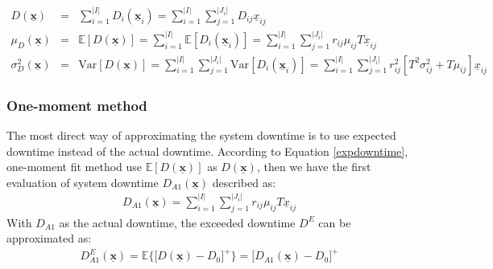 \documentclass[preprint,12pt]{elsarticle}
\begin{document}
\begin{eqnarray}
D(\boldsymbol{\underline{x}}) &=& \sum_{i=1}^{\lvert I \rvert}D_{i}(\boldsymbol{\underline{x}}_{i})
=\sum_{i=1}^{\lvert I \rvert}\sum_{j=1}^{\lvert J_{i}\rvert}{D_{ij}\underline{x}_{ij}}  \\
\mu_{D}(\boldsymbol{\underline{x}})&=&\mathbb{E}[D(\boldsymbol{\underline{x}})] = \sum^{\lvert I \rvert}_{i=1}\mathbb{E}[D_{i}(\boldsymbol{\underline{x}}_{i})] = \sum^{\lvert I \rvert}_{i=1} \sum_{j=1}^{\lvert J_{i} \rvert}{r_{ij}\mu_{ij}T\underline{x}_{ij}} \label{expdowntime}\\
\sigma^{2}_{D}(\boldsymbol{\underline{x}})&=&\textrm{Var}[D(\boldsymbol{\underline{x}})] = \sum_{i=1}^{\lvert I \rvert} \sum_{j=1}^{\lvert J_{i} \rvert}\textrm{Var}[D_{i}(\boldsymbol{\underline{x}}_{i})] = \sum_{i=1}^{\lvert I \rvert}\sum_{j=1}^{\lvert J_{i} \rvert}r_{ij}^{2}[T^{2}\sigma^{2}_{ij}+T\mu_{ij}]\underline{x}_{ij} \label{vardowntime}
\end{eqnarray}
\normalsize

\subsubsection{One-moment method}

The most direct way of approximating the system downtime is to use expected downtime instead of the actual downtime. According to Equation \eqref{expdowntime}, one-moment fit method use $\mathbb{E}[D(\boldsymbol{\underline{x}})]$ as $D(\boldsymbol{\underline{x}})$, then we have the first evaluation of system downtime $D_{A1}(\boldsymbol{\underline{x}})$ described as:
\small
\begin{eqnarray}
D_{A1}(\boldsymbol{\underline{x}}) = \sum^{\lvert I \rvert}_{i=1} \sum_{j=1}^{\lvert J_{i} \rvert}{r_{ij}\mu_{ij}T\underline{x}_{ij}}
\label{approximation1}
\end{eqnarray}
\normalsize
With $D_{A1}$ as the actual downtime, the exceeded downtime $D^{E}$ can be approximated as:
\begin{eqnarray}
D^{E}_{A1}(\boldsymbol{\underline{x}}) =\mathbb{E}\bigg\{\bigg[D(\boldsymbol{\underline{x}})-D_{0}\bigg]^{+}\bigg\} = \bigg[D_{A1}(\boldsymbol{\underline{x}})-D_{0} \bigg]^{+} \label{penapproximation1}
\end{eqnarray}
\end{document}
